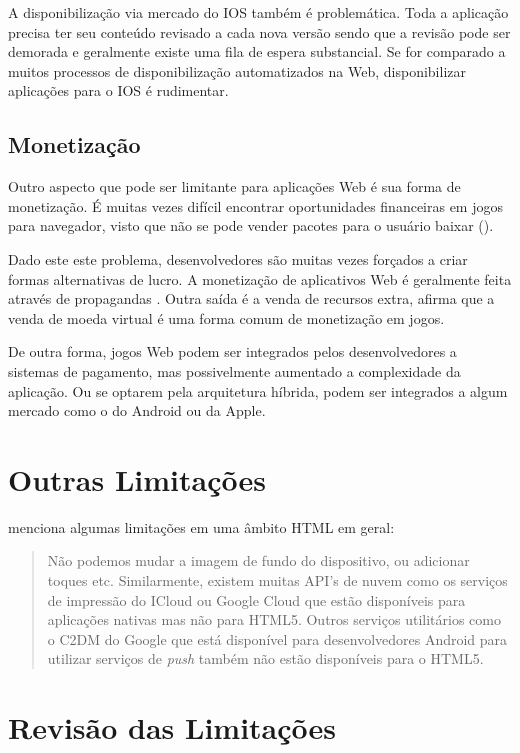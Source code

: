 A disponibilização via mercado do IOS também é problemática.
Toda a aplicação precisa ter seu conteúdo revisado a cada nova
versão sendo que a revisão pode ser demorada e geralmente existe uma
fila de espera substancial. Se for comparado a muitos processos de
disponibilização automatizados na Web, disponibilizar aplicações
para o IOS é rudimentar.

\subsection{Monetização}

Outro aspecto que pode ser limitante para aplicações Web é
sua forma de monetização. É muitas vezes difícil encontrar
oportunidades financeiras em jogos para navegador, visto que não
se pode vender pacotes para o usuário baixar \autocite[p. 44]{gameCommunities}
().

Dado este este problema, desenvolvedores são muitas vezes forçados
a criar formas alternativas de lucro. A monetização de aplicativos
Web é geralmente feita através de propagandas \autocite[p.
44]{gameCommunities}. Outra saída é a venda de recursos extra,
\citet[p. 44]{gameCommunities} afirma que a venda de moeda virtual é
uma forma comum de monetização em jogos.

De outra forma, jogos Web podem ser integrados pelos desenvolvedores
a sistemas de pagamento, mas possivelmente aumentado a complexidade
da aplicação. Ou se optarem pela arquitetura híbrida, podem ser
integrados a algum mercado como o do Android ou da Apple.

\section{Outras Limitações}

\citet{html5Tradeoffs} menciona algumas limitações em uma âmbito HTML em geral:

\begin{quote}
Não podemos mudar a imagem de fundo do dispositivo, ou adicionar toques
etc. Similarmente, existem muitas API's de nuvem como os serviços
de impressão do ICloud ou Google Cloud que estão disponíveis para
aplicações nativas mas não para HTML5. Outros serviços utilitários
como o C2DM do Google que está disponível para desenvolvedores Android
para utilizar serviços de \textit{push} também não estão disponíveis
para o HTML5.
\end{quote}


\section{Revisão das Limitações}

